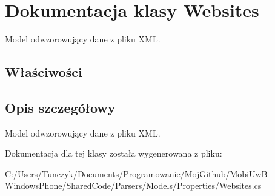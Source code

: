 \hypertarget{a00087}{}\section{Dokumentacja klasy Websites}
\label{a00087}


Model odwzorowujący dane z pliku X\+M\+L.  


\subsection*{Właściwości}


\subsection{Opis szczegółowy}
Model odwzorowujący dane z pliku X\+M\+L. 



Dokumentacja dla tej klasy została wygenerowana z pliku\+:\begin{DoxyCompactItemize}
\item 
C\+:/\+Users/\+Tunczyk/\+Documents/\+Programowanie/\+Moj\+Github/\+Mobi\+Uw\+B-\/\+Windows\+Phone/\+Shared\+Code/\+Parsers/\+Models/\+Properties/Websites.\+cs\end{DoxyCompactItemize}
